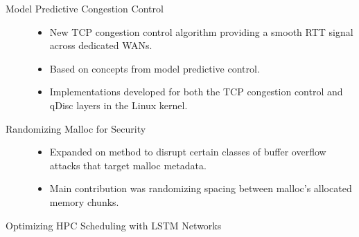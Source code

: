 \documentclass{resume}
\begin{document}
\begin{description}
    \item[Model Predictive Congestion Control] \hfill

        \begin{itemize}
        \item New TCP congestion control algorithm providing a smooth
          RTT signal across dedicated WANs.

        \item Based on concepts from model predictive control.

        \item Implementations developed for both the TCP congestion
          control and qDisc layers in the Linux kernel.
        \end{itemize}

    \item[Randomizing Malloc for Security] \hfill

        \begin{itemize}
        \item Expanded on method to disrupt certain classes of buffer
          overflow attacks that target malloc metadata.

        \item Main contribution was randomizing spacing between
          malloc's allocated memory chunks.
        \end{itemize}

      \item[Optimizing HPC Scheduling with LSTM Networks] \hfill


\end{description}
\end{document}
